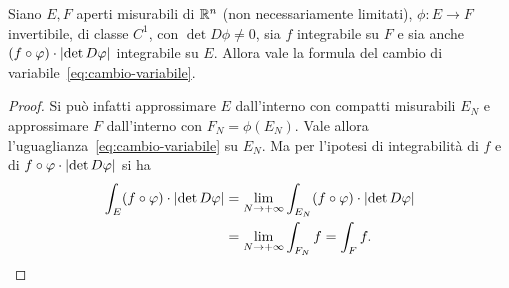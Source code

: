 \begin{theorem}
  \label{th:cambio_variabile_generalizzato}
Siano $E,F$ aperti misurabili di ${\mathbb R}^n$ (non necessariamente limitati),
$\phi\colon E\to F$ invertibile, di classe $C^1$, con $\det D\phi\neq 0$,
sia $f$ integrabile su $F$ e sia anche $(f\circ \varphi)\cdot {\left|\det D\varphi\right|}$ 
integrabile su $E$.
Allora vale la formula del cambio di variabile~\eqref{eq:cambio-variabile}.
\end{theorem}
%
\begin{proof}
Si può infatti approssimare $E$ dall'interno con compatti misurabili $E_N$ e approssimare 
$F$ dall'interno con $F_N=\phi(E_N)$. 
Vale allora l'uguaglianza~\eqref{eq:cambio-variabile} su $E_N$.
Ma per l'ipotesi di integrabilità di $f$ e di $f\circ \varphi \cdot {\left|\det D\varphi\right|}$ 
si ha
\begin{align*}
  \int_{E} (f\circ \varphi)\cdot {\left|\det D\varphi\right|}
  &= \lim_{N\to+\infty} \int_{E_N} (f\circ \varphi)\cdot {\left|\det D\varphi\right|}\\
  &= \lim_{N\to+\infty} \int_{F_N} f
  = \int_{F} f.
\end{align*}
\end{proof}
